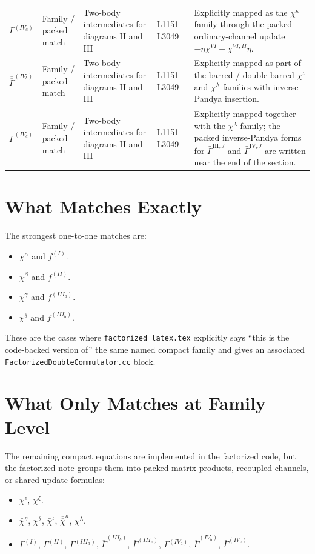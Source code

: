\documentclass{article}
\begin{document}
\begin{longtable}{p{} p{} p{} p{} p{}}
$\Gamma^{(IV_a)}$ & Family / packed match & Two-body intermediates for diagrams II and III & L1151--L3049 & Explicitly mapped as the $\chi^{\kappa}$ family through the packed ordinary-channel update $-\eta\chi^{VI}-\chi^{VI,II}\eta$. \\

$\overline{\overline\Gamma}^{(IV_b)}$ & Family / packed match & Two-body intermediates for diagrams II and III & L1151--L3049 & Explicitly mapped as part of the barred / double-barred $\chi^{\iota}$ and $\chi^{\lambda}$ families with inverse Pandya insertion. \\

$\bar\Gamma^{(IV_c)}$ & Family / packed match & Two-body intermediates for diagrams II and III & L1151--L3049 & Explicitly mapped together with the $\chi^{\lambda}$ family; the packed inverse-Pandya forms for $\bar\Gamma^{\mathrm{III}_cJ}$ and $\bar\Gamma^{\mathrm{IV}_cJ}$ are written near the end of the section. \\

\bottomrule
\end{longtable}

\section*{What Matches Exactly}

The strongest one-to-one matches are:
\begin{itemize}
\item $\chi^{\alpha}$ and $f^{(I)}$.
\item $\chi^{\beta}$ and $f^{(II)}$.
\item $\bar\chi^{\gamma}$ and $f^{(III_a)}$.
\item $\chi^{\delta}$ and $f^{(III_b)}$.
\end{itemize}

These are the cases where \texttt{factorized\_latex.tex} explicitly says
``this is the code-backed version of'' the same named compact family and gives
an associated \texttt{FactorizedDoubleCommutator.cc} block.

\section*{What Only Matches at Family Level}

The remaining compact equations are implemented in the factorized code, but the
factorized note groups them into packed matrix products, recoupled channels, or
shared update formulas:
\begin{itemize}
\item $\chi^{\epsilon}$, $\chi^{\zeta}$.
\item $\bar\chi^{\eta}$, $\chi^{\theta}$, $\bar\chi^{\iota}$,
  $\overline{\overline\chi}^{\kappa}$, $\chi^{\lambda}$.
\item $\Gamma^{(I)}$, $\Gamma^{(II)}$, $\Gamma^{(III_a)}$,
  $\overline{\overline\Gamma}^{(III_b)}$, $\bar\Gamma^{(III_c)}$,
  $\Gamma^{(IV_a)}$, $\overline{\overline\Gamma}^{(IV_b)}$,
  $\bar\Gamma^{(IV_c)}$.
\end{itemize}
\end{document}
